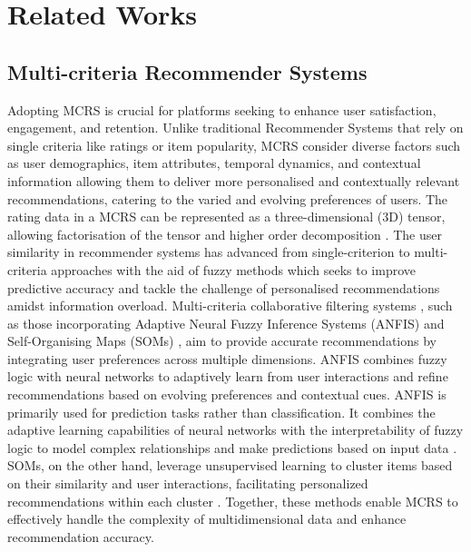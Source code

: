 \section{Related Works}
\subsection{Multi-criteria Recommender Systems}

    Adopting MCRS is crucial for platforms seeking to enhance user satisfaction, engagement, and retention. Unlike traditional Recommender Systems  that rely on single criteria like ratings or item popularity, MCRS consider diverse factors such as user demographics, item attributes, temporal dynamics, and contextual information \cite{zhang2021multi, gupta2020credibility} allowing them  to deliver more personalised and contextually relevant recommendations, catering to the varied and evolving preferences of users. The rating data in a MCRS can be represented as a three-dimensional (3D) tensor, allowing factorisation of the tensor and higher order decomposition \cite{pozo2016enhancing,papalexakis2016tensors, morise2019bayesian,hong2022sentiment}. The user similarity in recommender systems has advanced from single-criterion to multi-criteria approaches with the aid of fuzzy methods \cite{nilashi2014hybrid, kermany2017hybrid} which seeks to improve predictive accuracy and tackle the challenge of personalised recommendations amidst information overload. Multi-criteria collaborative filtering systems \cite{nassar2020novel}, such as those incorporating Adaptive Neural Fuzzy Inference Systems (ANFIS) \cite{nilashi2015multi} and Self-Organising Maps (SOMs) \cite{licen2023self}, aim to provide accurate recommendations by integrating user preferences across multiple dimensions. ANFIS combines fuzzy logic with neural networks to adaptively learn from user interactions and refine recommendations based on evolving preferences and contextual cues. ANFIS is primarily used for prediction tasks rather than classification. It combines the adaptive learning capabilities of neural networks with the interpretability of fuzzy logic to model complex relationships and make predictions based on input data \cite{zhang2021causal, jain2020tweet}. SOMs, on the other hand, leverage unsupervised learning to cluster items based on their similarity and user interactions, facilitating personalized recommendations within each cluster \cite{nilashi2014hybrid}. Together, these methods enable MCRS to effectively handle the complexity of multidimensional data and enhance recommendation accuracy.
    
